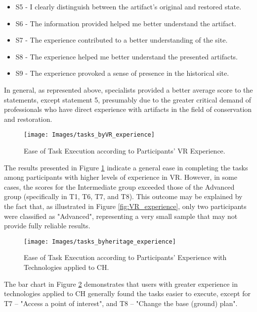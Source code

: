 \begin{itemize}
  \item S5 - I clearly distinguish between the artifact's original and restored state.
  \item S6 - The information provided helped me better understand the artifact.
  \item S7 - The experience contributed to a better understanding of the site.
  \item S8 - The experience helped me better understand the presented artifacts.
  \item S9 - The experience provoked a sense of presence in the historical site.
\end{itemize}

In general, as represented above, specialists provided a better average score to the statements, except statement 5, presumably due to the greater critical demand of professionals who have direct experience with artifacts in the field of conservation and restoration.

\begin{figure}[h!]
     \centering
     \texttt{[image: Images/tasks\_byVR\_experience]}
     \caption{Ease of Task Execution according to Participants’ \gls{VR} Experience.} 
     \label{fig:tasks_byVR_experience}
 \end{figure}

The results presented in Figure \ref{fig:tasks_byVR_experience} indicate a general ease in completing the tasks among participants with higher levels of experience in \gls{VR}. 
However, in some cases, the scores for the Intermediate group exceeded those of the Advanced group (specifically in T1, T6, T7, and T8). 
This outcome may be explained by the fact that, as illustrated in Figure \ref{fig:VR_experience}, only two participants were classified as "Advanced", representing a very small sample that may not provide fully reliable results.

\begin{figure}[h!]
    \centering
    \texttt{[image: Images/tasks\_byheritage\_experience]}
    \caption{Ease of Task Execution according to Participants’ Experience with Technologies applied to \gls{CH}.} 
    \label{fig:tasks_byheritage_experience}
\end{figure}

The bar chart in Figure \ref{fig:tasks_byheritage_experience} demonstrates that users with greater experience in technologies applied to \gls{CH} generally found the tasks easier to execute, except for T7 – "Access a point of interest", and T8 – "Change the base (ground) plan".

